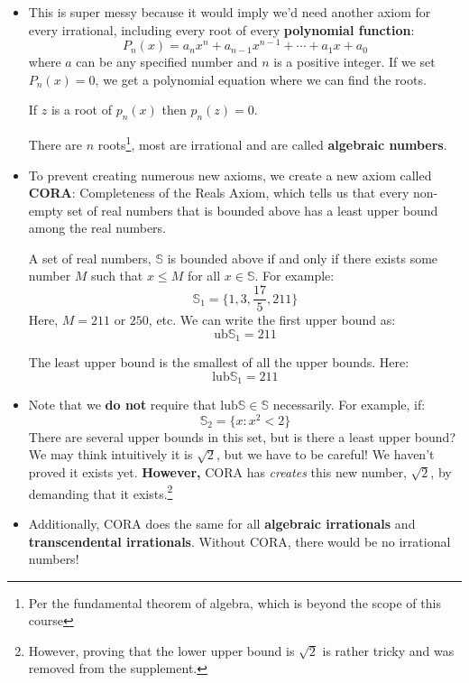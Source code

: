 \begin{itemize}
    \item This is super messy because it would imply we'd need another axiom for every irrational, including every root of every \textbf{polynomial function}:
        \begin{equation}
            P_n(x)=a_nx^n+a_{n-1}x^{n-1}+\cdots+a_1x+a_0
            \label{eq:}
        \end{equation}
    where $a$ can be any specified number and $n$ is a positive integer. If we set $P_n(x)=0$, we get a polynomial equation where we can find the roots.
    \begin{definition}
        If $z$ is a root of $p_n(x)$ then $p_n(z)=0$.
    \end{definition}
    There are $n$ roots\footnote{Per the fundamental theorem of algebra, which is beyond the scope of this course}, most are irrational and are called \textbf{algebraic numbers}.
    \item To prevent creating numerous new axioms, we create a new axiom called \textbf{CORA}: Completeness of the Reals Axiom, which tells us that every non-empty set of real numbers that is bounded above has a least upper bound among the real numbers.
    \begin{definition}
        A set of real numbers, $\mathbb{S}$ is bounded above if and only if there exists some number $M$ such that $x \le M$ for all $x \in \mathbb{S}$. For example:
        \begin{equation}
            \mathbb{S}_1=\{1,3,\frac{17}{5},211\}
            \label{eq:}
        \end{equation}
        Here, $M=211$ or $250$, etc. We can write the first upper bound as:
        \begin{equation}
            \mathrm{ub}\mathbb{S}_1=211
            \label{eq:}
        \end{equation}
    \end{definition}
    \begin{definition}
        The least upper bound is the smallest of all the upper bounds. Here:
        \begin{equation}
            \mathrm{lub}\mathbb{S}_1=211
            \label{eq:}
        \end{equation}
    \end{definition}
    \item Note that we \textbf{do not} require that $\mathrm{lub}\mathbb{S} \in \mathbb{S}$ necessarily. For example, if:
    \begin{equation}
        \mathbb{S}_2 = \{x:x^2<2\}
        \label{eq:}
    \end{equation}
    There are several upper bounds in this set, but is there a least upper bound? We may think intuitively it is $\sqrt{2}$, but we have to be careful! We haven't proved it exists yet. \textbf{However,} CORA has \textit{creates} this new number, $\sqrt{2}$, by demanding that it exists.\footnote{However, proving that the lower upper bound is $\sqrt{2}$ is rather tricky and was removed from the supplement.}
    \item Additionally, CORA does the same for all \textbf{algebraic irrationals} and \textbf{transcendental irrationals}. Without CORA, there would be no irrational numbers!
\end{itemize}